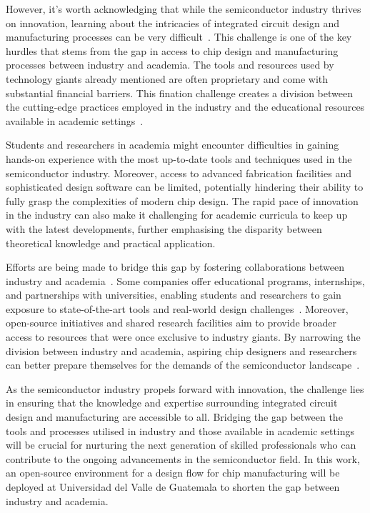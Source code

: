 However, it's worth acknowledging that while the semiconductor industry thrives on innovation, learning about the intricacies of integrated circuit design and manufacturing processes can be very difficult\ \cite{NIST2023Vision}. This challenge is one of the key hurdles that stems from the gap in access to chip design and manufacturing processes between industry and academia. The tools and resources used by technology giants already mentioned are often proprietary and come with substantial financial barriers. This fination challenge creates a division between the cutting-edge practices employed in the industry and the educational resources available in academic settings\ \cite*{CSIS2023Reshoring}.

Students and researchers in academia might encounter difficulties in gaining hands-on experience with the most up-to-date tools and techniques used in the semiconductor industry. Moreover, access to advanced fabrication facilities and sophisticated design software can be limited, potentially hindering their ability to fully grasp the complexities of modern chip design. The rapid pace of innovation in the industry can also make it challenging for academic curricula to keep up with the latest developments, further emphasising the disparity between theoretical knowledge and practical application.

Efforts are being made to bridge this gap by fostering collaborations between industry and academia\ \cite{Gargini2021roadmapping}. Some companies offer educational programs, internships, and partnerships with universities, enabling students and researchers to gain exposure to state-of-the-art tools and real-world design challenges\ \cite{TinyTapeout}. Moreover, open-source initiatives and shared research facilities aim to provide broader access to resources that were once exclusive to industry giants. By narrowing the division between industry and academia, aspiring chip designers and researchers can better prepare themselves for the demands of the semiconductor landscape\ \cite{Kettunen2022energizing}.

As the semiconductor industry propels forward with innovation, the challenge lies in ensuring that the knowledge and expertise surrounding integrated circuit design and manufacturing are accessible to all. Bridging the gap between the tools and processes utilised in industry and those available in academic settings will be crucial for nurturing the next generation of skilled professionals who can contribute to the ongoing advancements in the semiconductor field. In this work, an open-source environment for a design flow for chip manufacturing will be deployed at  Universidad del Valle de Guatemala to shorten the gap between industry and academia. 